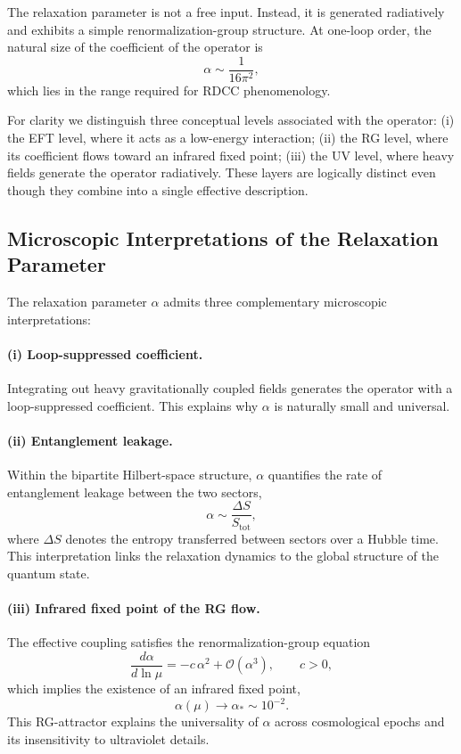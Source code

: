\documentclass[11pt,a4paper]{article}
\begin{document}
The relaxation parameter is not a free input. Instead, it is generated
radiatively and exhibits a simple renormalization-group structure. At one-loop
order, the natural size of the coefficient of the operator is
\begin{equation}
    \alpha \sim \frac{1}{16\pi^{2}},
\end{equation}
which lies in the range required for RDCC phenomenology.

For clarity we distinguish three conceptual levels associated with the operator:
(i) the EFT level, where it acts as a low-energy interaction;  
(ii) the RG level, where its coefficient flows toward an infrared fixed point;  
(iii) the UV level, where heavy fields generate the operator radiatively.  
These layers are logically distinct even though they combine into a single
effective description.


\subsection{Microscopic Interpretations of the Relaxation Parameter}

The relaxation parameter \(\alpha\) admits three complementary microscopic
interpretations:

\paragraph{(i) Loop-suppressed coefficient.}
Integrating out heavy gravitationally coupled fields generates the operator with
a loop-suppressed coefficient. This explains why \(\alpha\) is naturally small and
universal.

\paragraph{(ii) Entanglement leakage.}
Within the bipartite Hilbert-space structure, \(\alpha\) quantifies the rate of
entanglement leakage between the two sectors,
\begin{equation}
    \alpha \sim \frac{\Delta S}{S_{\mathrm{tot}}},
\end{equation}
where \(\Delta S\) denotes the entropy transferred between sectors over a Hubble
time. This interpretation links the relaxation dynamics to the global structure
of the quantum state.

\paragraph{(iii) Infrared fixed point of the RG flow.}
The effective coupling satisfies the renormalization-group equation
\begin{equation}
    \frac{d\alpha}{d\ln\mu}
        = -c\,\alpha^{2} + \mathcal{O}(\alpha^{3}),
    \qquad c > 0,
\end{equation}
which implies the existence of an infrared fixed point,
\begin{equation}
    \alpha(\mu) \longrightarrow \alpha_{*} \sim 10^{-2}.
\end{equation}
This RG-attractor explains the universality of \(\alpha\) across cosmological
epochs and its insensitivity to ultraviolet details.
\end{document}
